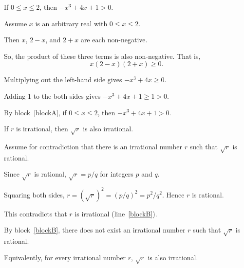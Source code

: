 \documentclass[11pt]{article}
\begin{document}
\begin{problems}


\problem

\begin{theorem}
  If $0\le x \le 2$, then $-x^3 + 4x+1>0$.
\end{theorem}
\begin{longFormProof}
  \begin{block}[blockA]
    {Assume $x$ is an arbitrary real with $0\le x\le 2$.}
    
    \step Then $x$, $2-x$, and $2+x$ are each non-negative.

    \step So, the product of these three terms is also non-negative.  That is,
    \[ x(2-x)(2+x) \ge 0.\]

    \step  Multiplying out the left-hand side gives \( -x^3 + 4x \ge 0 \).

    \step Adding 1 to the both sides gives \( -x^3 + 4x + 1 \ge 1 > 0\).
  \end{block}

  \step By block~\ref{blockA}, if $0\le x\le 2$, then $-x^3+4x+1 > 0$.
\end{longFormProof}


\problem

\begin{theorem}
  If $r$ is irrational, then $\sqrt r$ is also irrational.
\end{theorem}
\begin{longFormProof}
  \begin{block}[blockB]
    {Assume for contradiction 
      that there is an irrational number $r$
      such that $\sqrt r$ is rational.}
    
    \step Since $\sqrt r$ is rational, $\sqrt r = p/q$ for integers $p$ and $q$. 

    \step Squaring both sides, $r = (\sqrt r)^2 = (p/q)^2 = p^2/q^2$.  Hence $r$ is rational.

    \step This contradicts that $r$ is irrational (line~\ref{blockB}).
  \end{block}
  
  \step By block~\ref{blockB},
  there does not exist an irrational number $r$
  such that $\sqrt r$ is rational.

  \step Equivalently, for every irrational number $r$,  $\sqrt r$ is also irrational.
\end{longFormProof}


\end{problems}
\end{document}
